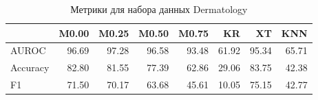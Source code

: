 \begin{table}
\caption{Метрики для набора данных Dermatology}
\label{tab:Dermatology}
\begin{tabular}{lrrrrrrr}
\toprule
 & M0.00 & M0.25 & M0.50 & M0.75 & KR & XT & KNN \\
\midrule
AUROC & 96.69 & 97.28 & 96.58 & 93.48 & 61.92 & 95.34 & 65.71 \\
Accuracy & 82.80 & 81.55 & 77.39 & 62.86 & 29.06 & 83.75 & 42.38 \\
F1 & 71.50 & 70.17 & 63.68 & 45.61 & 10.05 & 75.15 & 42.77 \\
\bottomrule
\end{tabular}
\end{table}
